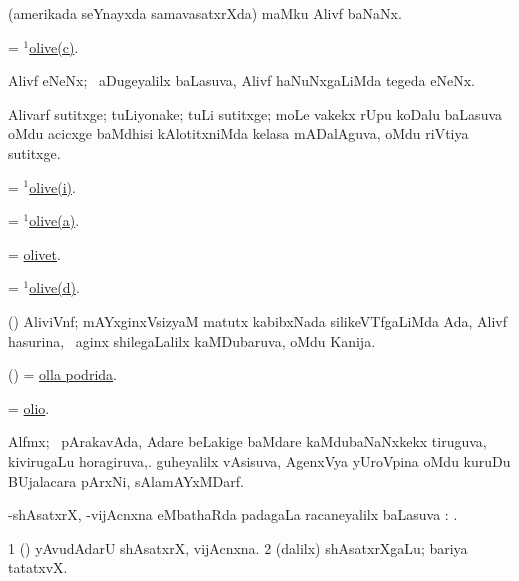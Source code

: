\bentry
{}
\gl{\nA}
\bmng
(amerikada seYnayxda samavasatxrXda) maMku Alivf baNaNx. 
\emng
\eentry

\bentry
{}
\gl{\nA}
\bmng
= \hyperlink{olive(1)c}{$^1$olive(c)}. 
\emng
\eentry

\bentry
{}
\gl{\nA}
\bmng
Alivf eNeNx; \kanmu\ aDugeyalilx baLasuva, Alivf haNuNxgaLiMda tegeda eNeNx. 
\emng
\eentry

\bentry
{}
\gl{\nA}
\bmng
Alivarf sutitxge; tuLiyonake; tuLi sutitxge; moLe \mo vakekx rUpu koDalu baLasuva oMdu acicxge baMdhisi kAlotitxniMda kelasa mADalAguva, oMdu riVtiya sutitxge. 
\emng
\eentry

\bentry
{}
\gl{\nA}
\bmng
= \hyperlink{olive(1)i}{$^1$olive(i)}. 
\emng
\eentry

\bentry
{}
\gl{\nA}
\bmng
= \hyperlink{olive(1)a}{$^1$olive(a)}. 
\emng
\eentry

\bentry
{}
\gl{\nA}
\bmng
= \hyperlink{olivet}{olivet}. 
\emng
\eentry

\bentry
{}
\gl{\nA}
\bmng
= \hyperlink{olive(1)d}{$^1$olive(d)}. 
\emng
\eentry

\bentry
{}
\gl{\nA}
\bmng
(\Kani) AliviVnf; mAYxginxVsizyaM matutx kabibxNada silikeVTfgaLiMda Ada, Alivf hasurina, \sA\ aginx shilegaLalilx kaMDubaruva, oMdu Kanija. 
\emng
\eentry

\bentry
{}
\gl{\nA}
\bmng
(\viparx) = \hyperlink{olla podrida}{olla podrida}. 
\emng
\eentry

\bentry
{}
\gl{\nA}
\bmng
= \hyperlink{olio}{olio}. 
\emng
\eentry

\bentry
{}
\gl{\nA}
\bmng
Alfmx; \sA\ pArakavAda, Adare beLakige baMdare kaMdubaNaNxkekx tiruguva, kivirugaLu horagiruva,. guheyalilx vAsisuva, AgenxVya yUroVpina oMdu kuruDu BUjalacara pArxNi, sAlamAYxMDarf. 
\emng
\eentry

\bentry
{}
\gl{\saupa}
\bmng
-shAsatxrX, -vijAcnxna eMbathaRda padagaLa racaneyalilx baLasuva \saupa: . 
\emng
\eentry

\bentry
{}
\gl{\nA}
\bmng
\bnum
\num{1} (\hA) yAvudAdarU shAsatxrX, vijAcnxna. 
\num{2} (\bava dalilx) shAsatxrXgaLu; bariya tatatxvX. 
\enum
\emng
\eentry

